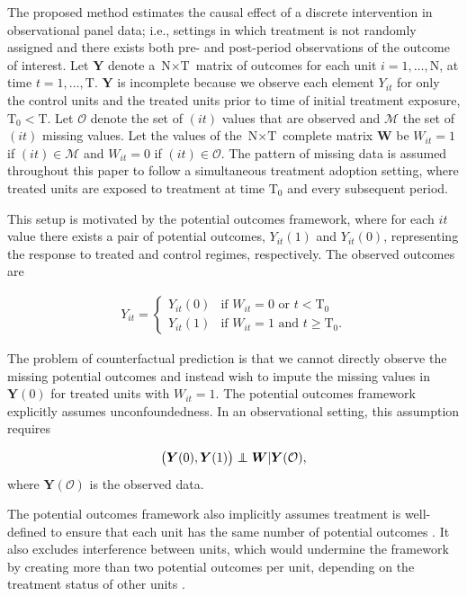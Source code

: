 The proposed method estimates the causal effect of a discrete intervention in observational panel data; i.e., settings in which treatment is not randomly assigned and there exists both pre- and post-period observations of the outcome of interest. Let $\boldsymbol{Y}$ denote a $\text{N} \times \text{T}$ matrix of outcomes for each unit $i =1, \ldots, \text{N}$, at time $t = 1, \ldots, \text{T}$. $\boldsymbol{Y}$ is incomplete because we observe each element $Y_{it}$ for only the control units and the treated units prior to time of initial treatment exposure, $\text{T}_0 < \text{T}$. Let $\mathcal{O}$ denote the set of $(it)$ values that are observed and $\mathcal{M}$ the set of $(it)$ missing values. Let the values of the $\text{N} \times \text{T}$ complete matrix $\boldsymbol{W}$ be $W_{it} =1$ if $(it) \in \mathcal{M}$ and $W_{it} = 0$ if $(it) \in \mathcal{O}$. The pattern of missing data is assumed throughout this paper to follow a simultaneous treatment adoption setting, where treated units are exposed to treatment at time $\text{T}_0$ and every subsequent period. 

This setup is motivated by the \citet{neyman1923} potential outcomes framework, where for each $it$ value there exists a pair of potential outcomes, $Y_{it}(1)$ and $Y_{it}(0)$, representing the response to treated and control regimes, respectively. The observed outcomes are 

\begin{align*} 
Y_{it} = \begin{cases}
Y_{it}(0) 	& \mbox{if } W_{it} = 0  \text{ or } t < \text{T}_0 \\
Y_{it}(1) 	& \mbox{if } W_{it} = 1  \text{ and } t \geq \text{T}_0.
\end{cases} 
\end{align*} 

The problem of counterfactual prediction is that we cannot directly observe the missing potential outcomes and instead wish to impute the missing values in $\boldsymbol{Y}(0)$ for treated units with $W_{it} =1$.  The potential outcomes framework explicitly assumes unconfoundedness. In an observational setting, this assumption requires

$$
\left(\boldsymbol{Y}(0), \boldsymbol{Y}(1) \right) \independent \boldsymbol{W}| \boldsymbol{Y}(\mathcal{O}),
$$ where $\boldsymbol{Y}(\mathcal{O})$ is the observed data. 

The potential outcomes framework also implicitly assumes treatment is well-defined to ensure that each unit has the same number of potential outcomes \citep{imbens2015causal}. It also excludes interference between units, which would undermine the framework by creating more than two potential outcomes per unit, depending on the treatment status of other units \citep{rubin1990}.

